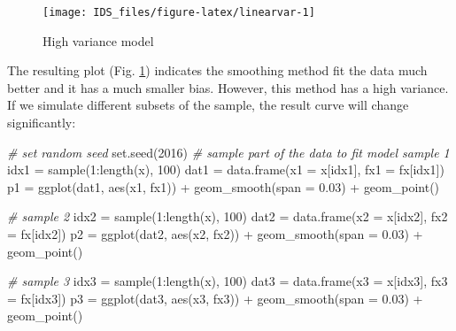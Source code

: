 \documentclass[
  12pt,
]{krantz}
\makeatletter
\newenvironment{Shaded}{\begin{snugshade}}{\end{snugshade}}
\newcommand{\AttributeTok}[1]{\textcolor[rgb]{0.61,0.61,0.61}{#1}}
\newcommand{\CommentTok}[1]{\textcolor[rgb]{0.37,0.37,0.37}{\textit{#1}}}
\newcommand{\DecValTok}[1]{\textcolor[rgb]{0.06,0.06,0.06}{#1}}
\newcommand{\FloatTok}[1]{\textcolor[rgb]{0.06,0.06,0.06}{#1}}
\newcommand{\FunctionTok}[1]{\textcolor[rgb]{0,0,0}{#1}}
\newcommand{\NormalTok}[1]{#1}
\newcommand{\OtherTok}[1]{\textcolor[rgb]{0.37,0.37,0.37}{#1}}
\newcommand{\SpecialCharTok}[1]{\textcolor[rgb]{0,0,0}{#1}}
\newenvironment{kframe}{%
\medskip{}
\setlength{\fboxsep}{.8em}
 \def\at@end@of@kframe{}%
 \ifinner\ifhmode%
  \def\at@end@of@kframe{\end{minipage}}%
  \begin{minipage}{\columnwidth}%
 \fi\fi%
 \def\FrameCommand##1{\hskip\@totalleftmargin \hskip-\fboxsep
 \colorbox{shadecolor}{##1}\hskip-\fboxsep
     \hskip-\linewidth \hskip-\@totalleftmargin \hskip\columnwidth}%
 \MakeFramed {\advance\hsize-\width
   \@totalleftmargin\z@ \linewidth\hsize
   \@setminipage}}%
 {\par\unskip\endMakeFramed%
 \at@end@of@kframe}
\renewenvironment{Shaded}{\begin{kframe}}{\end{kframe}}
\makeatother
\begin{document}
\begin{figure}

{\centering \texttt{[image: IDS\_files/figure-latex/linearvar-1]} 

}

\caption{High variance model}\label{fig:linearvar}
\end{figure}

The resulting plot (Fig. \ref{fig:linearvar}) indicates the smoothing method fit the data much better and it has a much smaller bias. However, this method has a high variance. If we simulate different subsets of the sample, the result curve will change significantly:

\begin{Shaded}
\begin{Highlighting}[]
\CommentTok{\# set random seed}
\FunctionTok{set.seed}\NormalTok{(}\DecValTok{2016}\NormalTok{)}
\CommentTok{\# sample part of the data to fit model sample 1}
\NormalTok{idx1 }\OtherTok{=} \FunctionTok{sample}\NormalTok{(}\DecValTok{1}\SpecialCharTok{:}\FunctionTok{length}\NormalTok{(x), }\DecValTok{100}\NormalTok{)}
\NormalTok{dat1 }\OtherTok{=} \FunctionTok{data.frame}\NormalTok{(}\AttributeTok{x1 =}\NormalTok{ x[idx1], }\AttributeTok{fx1 =}\NormalTok{ fx[idx1])}
\NormalTok{p1 }\OtherTok{=} \FunctionTok{ggplot}\NormalTok{(dat1, }\FunctionTok{aes}\NormalTok{(x1, fx1)) }\SpecialCharTok{+} 
  \FunctionTok{geom\_smooth}\NormalTok{(}\AttributeTok{span =} \FloatTok{0.03}\NormalTok{) }\SpecialCharTok{+} 
  \FunctionTok{geom\_point}\NormalTok{()}

\CommentTok{\# sample 2}
\NormalTok{idx2 }\OtherTok{=} \FunctionTok{sample}\NormalTok{(}\DecValTok{1}\SpecialCharTok{:}\FunctionTok{length}\NormalTok{(x), }\DecValTok{100}\NormalTok{)}
\NormalTok{dat2 }\OtherTok{=} \FunctionTok{data.frame}\NormalTok{(}\AttributeTok{x2 =}\NormalTok{ x[idx2], }\AttributeTok{fx2 =}\NormalTok{ fx[idx2])}
\NormalTok{p2 }\OtherTok{=} \FunctionTok{ggplot}\NormalTok{(dat2, }\FunctionTok{aes}\NormalTok{(x2, fx2)) }\SpecialCharTok{+} 
  \FunctionTok{geom\_smooth}\NormalTok{(}\AttributeTok{span =} \FloatTok{0.03}\NormalTok{) }\SpecialCharTok{+} 
  \FunctionTok{geom\_point}\NormalTok{()}

\CommentTok{\# sample 3}
\NormalTok{idx3 }\OtherTok{=} \FunctionTok{sample}\NormalTok{(}\DecValTok{1}\SpecialCharTok{:}\FunctionTok{length}\NormalTok{(x), }\DecValTok{100}\NormalTok{)}
\NormalTok{dat3 }\OtherTok{=} \FunctionTok{data.frame}\NormalTok{(}\AttributeTok{x3 =}\NormalTok{ x[idx3], }\AttributeTok{fx3 =}\NormalTok{ fx[idx3])}
\NormalTok{p3 }\OtherTok{=} \FunctionTok{ggplot}\NormalTok{(dat3, }\FunctionTok{aes}\NormalTok{(x3, fx3)) }\SpecialCharTok{+} 
  \FunctionTok{geom\_smooth}\NormalTok{(}\AttributeTok{span =} \FloatTok{0.03}\NormalTok{) }\SpecialCharTok{+} 
  \FunctionTok{geom\_point}\NormalTok{()}


\end{Highlighting}
\end{Shaded}
\end{document}
